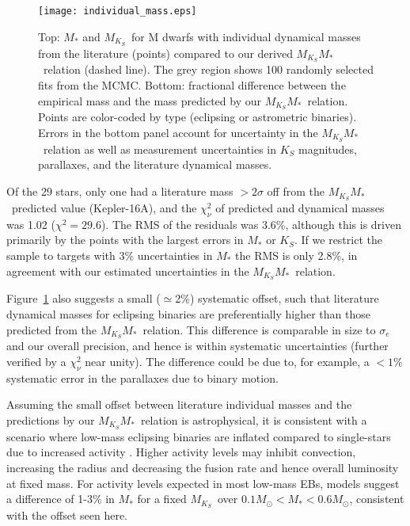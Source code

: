 \documentclass[twocolumn]{aastex62}
\newcommand{\mks}{$M_{K_S}$}
\newcommand{\mmk}{$M_{K_S}$\textendash$M_*$}
\begin{document}
\begin{figure}[th]
\begin{center}
\texttt{[image: individual\_mass.eps]}
\caption{Top: $M_*$ and \mks\ for M dwarfs with individual dynamical masses from the literature (points) compared to our derived \mmk\ relation (dashed line). The grey region shows 100 randomly selected fits from the MCMC. Bottom: fractional difference between the empirical mass and the mass predicted by our \mmk\ relation. Points are color-coded by type (eclipsing or astrometric binaries). Errors in the bottom panel account for uncertainty in the \mmk\ relation as well as measurement uncertainties in $K_S$ magnitudes, parallaxes, and the literature dynamical masses. }
\label{fig:ind}
\end{center}
\end{figure}

Of the 29 stars, only one had a literature mass $>2\sigma$ off from the \mmk\ predicted value (Kepler-16A), and the $\chi^2_\nu$ of predicted and dynamical masses was 1.02 ($\chi^2=29.6$). The RMS of the residuals was 3.6\%, although this is driven primarily by the points with the largest errors in $M_*$ or $K_S$. If we restrict the sample to targets with 3\% uncertainties in $M_*$ the RMS is only 2.8\%, in agreement with our estimated uncertainties in the \mmk\ relation. 

Figure~\ref{fig:ind} also suggests a small ($\simeq$2\%) systematic offset, such that literature dynamical masses for eclipsing binaries are preferentially higher than those predicted from the \mmk\ relation. This difference is comparable in size to $\sigma_e$ and our overall precision, and hence is within systematic uncertainties (further verified by a $\chi^2_\nu$ near unity). The difference could be due to, for example, a $<1$\% systematic error in the parallaxes due to binary motion. 

Assuming the small offset between literature individual masses and the predictions by our \mmk\ relation is astrophysical, it is consistent with a scenario where low-mass eclipsing binaries are inflated compared to single-stars due to increased activity \citep[e.g.,][]{MacDonald2012, Feiden2013,Feiden2014a,Somers2017}. Higher activity levels may inhibit convection, increasing the radius and decreasing the fusion rate and hence overall luminosity at fixed mass. For activity levels expected in most low-mass EBs, \citet{Feiden:2016aa} models suggest a difference of 1-3\% in $M_*$ for a fixed \mks\ over $0.1M_\odot<M_*<0.6M_\odot$, consistent with the offset seen here. 
\end{document}
